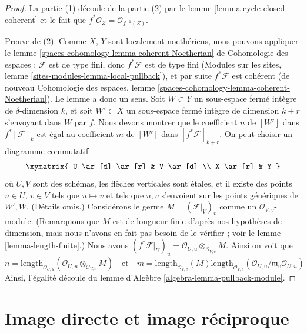 \begin{proof}
La partie (1) découle de la partie (2) par le lemme
\ref{lemma-cycle-closed-coherent} et le fait que $f^*\mathcal{O}_Z =
\mathcal{O}_{f^{-1}(Z)}$.

\medskip\noindent
Preuve de (2). Comme $X$, $Y$ sont localement noethériens, nous pouvons
appliquer le lemme
\ref{spaces-cohomology-lemma-coherent-Noetherian} de Cohomologie des espaces :
$\mathcal{F}$ est de type fini, donc $f^*\mathcal{F}$ est de type fini (Modules
sur les sites, lemme \ref{sites-modules-lemma-local-pullback}), et par suite
$f^*\mathcal{F}$ est cohérent (de nouveau Cohomologie des espaces, lemme
\ref{spaces-cohomology-lemma-coherent-Noetherian}). Le lemme a donc un sens.
Soit $W \subset Y$ un sous-espace fermé intègre de $\delta$-dimension $k$, et
soit $W' \subset X$ un sous-espace fermé intègre de dimension $k + r$
s'envoyant dans $W$ par $f$. Nous devons montrer que le
coefficient $n$ de $[W']$ dans $f^*[{\mathcal F}]_k$ est égal au
coefficient $m$ de $[W']$ dans $[f^*{\mathcal F}]_{k+r}$. On peut choisir un
diagramme commutatif
$$
\xymatrix{
U \ar[d] \ar[r] & V \ar[d] \\
X \ar[r] & Y
}
$$
où $U, V$ sont des schémas, les flèches verticales sont \'etales, et il existe
des points $u \in U$, $v \in V$ tels que $u \mapsto v$ et tels que $u, v$
s'envoient sur les points génériques de $W', W$. (Détails omis.) Considérons le
germe $M = (\mathcal{F}|_V)_v$ comme un $\mathcal{O}_{V, v}$-module.
(Remarquons que $M$ est de longueur finie d'après nos hypothèses de dimension,
mais nous n'avons en fait pas besoin de le vérifier ; voir le lemme
\ref{lemma-length-finite}.) Nous avons $(f^*\mathcal{F}|_U)_u =
\mathcal{O}_{U, u} \otimes_{\mathcal{O}_{V, v}} M$. Ainsi on voit que
$$
n = \text{length}_{\mathcal{O}_{U, u}}
(\mathcal{O}_{U, u} \otimes_{\mathcal{O}_{V, v}} M)
\quad
\text{et}
\quad
m = \text{length}_{\mathcal{O}_{V, v}}(M)
\text{length}_{\mathcal{O}_{V, v}}(
\mathcal{O}_{U, u}/\mathfrak m_v \mathcal{O}_{U, u})
$$
Ainsi, l'égalité découle du lemme d'Algèbre
\ref{algebra-lemma-pullback-module}.
\end{proof}









\section{Image directe et image réciproque}
\label{section-push-pull}

